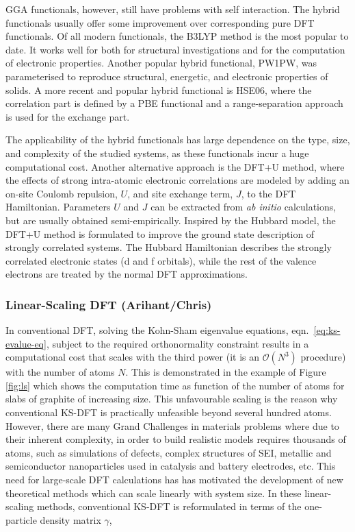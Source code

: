 \documentclass[../main.tex]{subfiles}
\begin{document}
GGA functionals, however, still have problems with self interaction. The hybrid functionals usually offer some improvement over corresponding pure DFT functionals. Of all modern functionals, the B3LYP method is the most popular to date. \cite{adb1993b,cl1988785} It works well for both for structural investigations and for the computation of electronic properties. \cite{Cramer} Another popular hybrid functional, PW1PW, \cite{Bredow00,IslamPRB} was parameterised to reproduce structural, energetic, and electronic properties of solids. A more recent and popular hybrid functional is HSE06, where  the correlation part is defined by a PBE functional and a range-separation approach is used for the exchange part. \cite{HSE06}  

The applicability of the hybrid functionals has large dependence on the type, size, and complexity of the studied systems, as these functionals incur a huge computational cost. Another alternative approach is the DFT+U method, where the effects of strong intra-atomic electronic correlations are modeled by adding an on-site Coulomb repulsion, $U$, and site exchange term, $J$, to the DFT Hamiltonian. \cite{DFT-U-1,DFT-U-2,DFT-U-3} Parameters $U$ and $J$ can be extracted from \textit{ab initio} calculations, but are usually obtained semi-empirically. Inspired by the Hubbard model, the DFT+U method is formulated to improve the ground state description of strongly correlated systems. The Hubbard Hamiltonian describes the strongly correlated electronic states (d and f orbitals), while the rest of the valence electrons are treated by the normal DFT approximations. 

\subsubsection{Linear-Scaling DFT (Arihant/Chris)}
\label{sec:lsdft}
In conventional DFT, solving the Kohn-Sham eigenvalue equations, eqn.~\ref{eq:ks-evalue-eq}, subject to the required orthonormality constraint results in a computational cost that scales with the third power (it is an  $\mathcal{O}(N^3)$ procedure) with the number of atoms $N$. This is demonstrated in the example of Figure \ref{fig:ls} which shows the computation time as function of the number of atoms for slabs of graphite of increasing size. This unfavourable scaling is the reason why conventional KS-DFT is  practically unfeasible beyond several hundred atoms. However, there are many Grand Challenges in materials problems where due to their inherent complexity, in order to build realistic models requires thousands of atoms, such as simulations of defects, complex structures of SEI, metallic and semiconductor nanoparticles used in catalysis and battery electrodes, etc. This need for large-scale DFT calculations has has motivated the development of new theoretical methods which can scale linearly with system size.\cite{Goedecker1999} In these linear-scaling methods, conventional KS-DFT is reformulated in terms of the one-particle density matrix $\gamma$,
\end{document}
